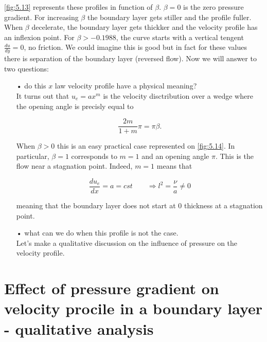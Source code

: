			\autoref{fig:5.13} represents these profiles in function of $\beta$. $\beta = 0$ is the zero pressure gradient. For increasing $\beta$ the boundary layer gets stiller and the profile fuller. When $\beta$ decelerate, the boundary layer gets thickker and the velocity profile has an inflexion point. For $\beta > -0.1988$, the curve starts with a vertical tengent $\frac{du}{dy} = 0$, no friction. We could imagine this is good but in fact for these values there is separation of the boundary layer (reversed flow). Now we will answer to two questions:\\
			
			\begin{itemize}
				\item[•] do this $x$ law velocity profile have a physical meaning?\\
				It turns out that $u_e = a x^m$ is the velocity disctribution over a wedge where the opening angle is precisly equal to 

				\begin{equation}
					\frac{2m}{1+m} \pi = \pi \beta .
				\end{equation} 
				
					When $\beta > 0$ this is an easy practical case represented on \autoref{fig:5.14}. In particular, $\beta =1$ corresponds to $m=1$ and an opening angle $\pi$. This is the flow near a stagnation point. Indeed, $m = 1$ means that 
					
					\begin{equation}
						\frac{du_e}{dx} = a = cst \qquad \Rightarrow l^2 = \frac{\nu}{a} \neq 0 
					\end{equation}
					
					meaning that the boundary layer does not start at 0 thickness at a stagnation point. \\
				
				\item[•] what can we do when this profile is not the case. \\
				Let's make a qualitative discussion on the influence of pressure on the velocity profile. 
			\end{itemize}			   
			
			
\section{Effect of pressure gradient on velocity procile in a boundary layer - qualitative analysis}
		
